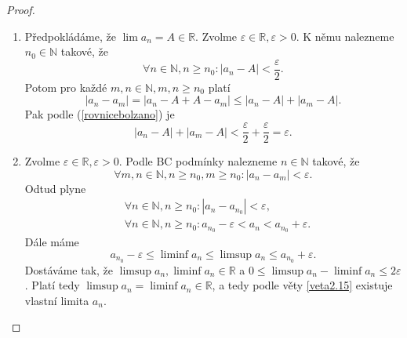 \begin{proof}\,
\begin{enumerate}
	\item[$\implies$] Předpokládáme, že $\lim a_n = A\in \mathbb R $. Zvolme $\varepsilon \in \mathbb R ,\varepsilon > 0$.
	K němu nalezneme $n_0 \in \mathbb N $ takové, že
	\begin{equation}\label{rovnicebolzano}
	\forall n \in \mathbb N , n \geq n_0: |a_n - A| < \frac{\varepsilon}{2}.
\end{equation}
	Potom pro každé $m,n \in \mathbb N , m,n \geq n_0$ platí
	$$
	    |a_n - a_m| = |a_n - A+A-a_m| \leq |a_n - A| + |a_m - A|.
	$$
	Pak podle (\ref{rovnicebolzano}) je
	$$
	|a_n - A| + |a_m - A| < \frac{\varepsilon}{2} + \frac{\varepsilon}{2} = \varepsilon.
	$$
	\item[$\impliedby$] Zvolme $\varepsilon \in \mathbb R , \varepsilon > 0$. Podle BC podmínky
	nalezneme $n \in \mathbb N $ takové, že
	$$
	\forall m,n \in \mathbb N , n\geq n_0, m\geq n_0: |a_n-a_m| < \varepsilon.
	$$
	Odtud plyne
	\begin{align*}
	&\forall n \in \mathbb N, n \geq n_0: |a_n - a_{n_0}| < \varepsilon, \\
	&	\forall n \in \mathbb N, n \geq n_0: a_{n_0} - \varepsilon < a_n < a_{n_0} +\varepsilon.
	\end{align*}
	Dále máme
	$$
	    a_{n_0} - \varepsilon \leq \liminf a_n \leq \limsup a_n \leq a_{n_0} + \varepsilon.
	$$
	Dostáváme tak, že $\limsup a_n, \liminf a_n \in \mathbb R $ a $0 \leq \limsup a_n - \liminf a_n \leq 2\varepsilon$.
	Platí tedy $\limsup a_n = \liminf a_n \in \mathbb R $, a tedy podle věty \ref{veta2.15}
	existuje vlastní limita $a_n$.\qedhere
\end{enumerate}
\end{proof}
